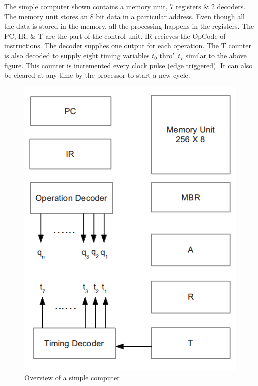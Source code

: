 \documentclass{book}
\begin{document}
\begin{itemize}
The simple computer shown contains a memory unit, 7 registers \& 2 decoders. The memory unit stores an 8 bit data in a particular address. Even though all the data is stored in the memory, all the processing happens in the registers. The PC, IR, \& T are the part of the control unit. IR recieves the OpCode of instructions. The decoder supplies one output for each operation. The T counter is also decoded to supply eight timing variables $t_0$ thro\rq\ $t_7$ similar to the above figure. This counter is incremented every clock pulse (edge triggered). It can also be cleared at any time by the processor to start a new cycle.

\end{itemize}

\begin{figure}[h]

\begin{center}
  \includegraphics[scale=.60]{imgs/basic_comp.png}
\end{center}
\caption{Overview of a simple computer}
\end{figure}
\end{document}
